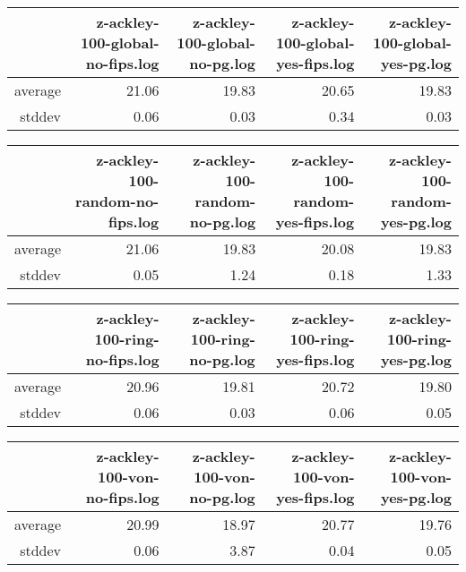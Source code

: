 \begin{table}[ht]
\centering
\begin{tabular}{rrrrr}
  \hline
 & z-ackley-100-global-no-fips.log & z-ackley-100-global-no-pg.log & z-ackley-100-global-yes-fips.log & z-ackley-100-global-yes-pg.log \\ 
  \hline
average & 21.06 & 19.83 & 20.65 & 19.83 \\ 
  stddev & 0.06 & 0.03 & 0.34 & 0.03 \\ 
   \hline
\end{tabular}
\end{table}
\begin{table}[ht]
\centering
\begin{tabular}{rrrrr}
  \hline
 & z-ackley-100-random-no-fips.log & z-ackley-100-random-no-pg.log & z-ackley-100-random-yes-fips.log & z-ackley-100-random-yes-pg.log \\ 
  \hline
average & 21.06 & 19.83 & 20.08 & 19.83 \\ 
  stddev & 0.05 & 1.24 & 0.18 & 1.33 \\ 
   \hline
\end{tabular}
\end{table}
\begin{table}[ht]
\centering
\begin{tabular}{rrrrr}
  \hline
 & z-ackley-100-ring-no-fips.log & z-ackley-100-ring-no-pg.log & z-ackley-100-ring-yes-fips.log & z-ackley-100-ring-yes-pg.log \\ 
  \hline
average & 20.96 & 19.81 & 20.72 & 19.80 \\ 
  stddev & 0.06 & 0.03 & 0.06 & 0.05 \\ 
   \hline
\end{tabular}
\end{table}
\begin{table}[ht]
\centering
\begin{tabular}{rrrrr}
  \hline
 & z-ackley-100-von-no-fips.log & z-ackley-100-von-no-pg.log & z-ackley-100-von-yes-fips.log & z-ackley-100-von-yes-pg.log \\ 
  \hline
average & 20.99 & 18.97 & 20.77 & 19.76 \\ 
  stddev & 0.06 & 3.87 & 0.04 & 0.05 \\ 
   \hline
\end{tabular}
\end{table}
